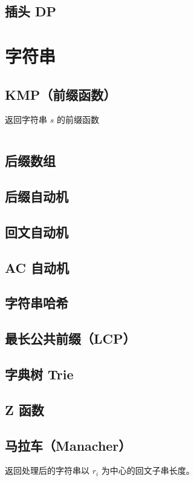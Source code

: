 \documentclass[a4paper, twoside]{article}
\begin{document}
\subsection{插头 DP}


\newpage
\section{字符串}
\subsection{KMP（前缀函数）}
返回字符串 $s$ 的前缀函数
\inputminted{cpp}{../src/字符串/KMP（前缀函数）.cpp}

\subsection{后缀数组}

\subsection{后缀自动机}

\subsection{回文自动机}

\subsection{AC 自动机}

\subsection{字符串哈希}

\subsection{最长公共前缀（LCP）}

\subsection{字典树 Trie}

\subsection{Z 函数}

\subsection{马拉车（Manacher）}
返回处理后的字符串以 $r_i$ 为中心的回文子串长度。
\inputminted{cpp}{../src/字符串/Manacher.cpp}
\end{document}
